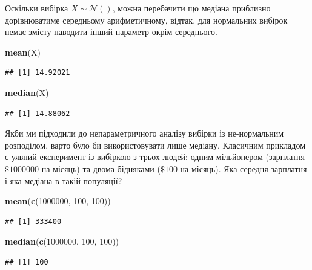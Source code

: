 \documentclass[
  11pt,
]{book}
\newenvironment{Shaded}{\begin{snugshade}}{\end{snugshade}}
\newcommand{\DecValTok}[1]{\textcolor[rgb]{0.00,0.00,0.81}{#1}}
\newcommand{\FunctionTok}[1]{\textcolor[rgb]{0.13,0.29,0.53}{\textbf{#1}}}
\newcommand{\NormalTok}[1]{#1}
\begin{document}
Оскільки вибірка \(X \sim \mathcal{N}()\), можна перебачити що медіана приблизно дорівнюватиме середньому арифметичному, відтак, для нормальних вибірок немає змісту наводити інший параметр окрім середнього.

\begin{Shaded}
\begin{Highlighting}[]
\FunctionTok{mean}\NormalTok{(X)}
\end{Highlighting}
\end{Shaded}

\begin{verbatim}
## [1] 14.92021
\end{verbatim}

\begin{Shaded}
\begin{Highlighting}[]
\FunctionTok{median}\NormalTok{(X)}
\end{Highlighting}
\end{Shaded}

\begin{verbatim}
## [1] 14.88062
\end{verbatim}

Якби ми підходили до непараметричного аналізу вибірки із не-нормальним розподілом, варто було би використовувати лише медіану. Класичним прикладом є уявний експеримент із вибіркою з трьох людей: одним мільйонером (зарплатня \(\$1000000\) на місяць) та двома бідняками (\(\$100\) на місяць). Яка середня зарплатня і яка медіана в такій популяції?

\begin{Shaded}
\begin{Highlighting}[]
\FunctionTok{mean}\NormalTok{(}\FunctionTok{c}\NormalTok{(}\DecValTok{1000000}\NormalTok{, }\DecValTok{100}\NormalTok{, }\DecValTok{100}\NormalTok{))}
\end{Highlighting}
\end{Shaded}

\begin{verbatim}
## [1] 333400
\end{verbatim}

\begin{Shaded}
\begin{Highlighting}[]
\FunctionTok{median}\NormalTok{(}\FunctionTok{c}\NormalTok{(}\DecValTok{1000000}\NormalTok{, }\DecValTok{100}\NormalTok{, }\DecValTok{100}\NormalTok{))}
\end{Highlighting}
\end{Shaded}

\begin{verbatim}
## [1] 100
\end{verbatim}
\end{document}
